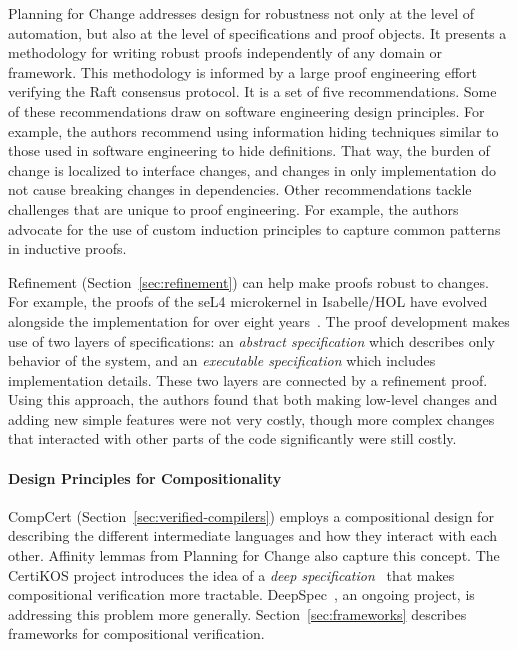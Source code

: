 Planning for Change addresses design for robustness not only at the level of automation,
but also at the level of specifications and proof objects. It presents a methodology
for writing robust proofs independently of any domain or framework. This methodology
is informed by a large proof engineering effort verifying the Raft consensus protocol.
It is a set of five recommendations. Some of these recommendations draw on software engineering design principles.
For example, the authors recommend using information hiding techniques similar to those used in software engineering to hide definitions.
That way, the burden of change is localized to interface changes, and changes in only implementation do not cause
breaking changes in dependencies. Other recommendations tackle challenges that are unique to proof engineering. For example, the authors
advocate for the use of custom induction principles to capture common patterns in inductive proofs.

Refinement (Section~\ref{sec:refinement}) can help make proofs robust to changes.
For example, the proofs of the seL4 microkernel in Isabelle/HOL have evolved alongside the implementation for
over eight years~\citep{Klein2014micro}.
The proof development makes use of two layers of specifications: an \textit{abstract specification} which describes only behavior of
the system, and an \textit{executable specification} which includes implementation details. These two layers are connected by
a refinement proof.
Using this approach, the authors found that both making low-level changes and adding new simple features were not very costly,
though more complex changes that interacted with other parts of the code significantly were still costly.

\paragraph{Design Principles for Compositionality}
CompCert (Section~\ref{sec:verified-compilers}) employs a compositional design for describing the different intermediate languages
and how they interact with each other. Affinity lemmas from Planning for Change
also capture this concept.
The CertiKOS project introduces the idea of a \textit{deep specification}~\citep{Gu-al:POPL15} that makes
compositional verification more tractable. DeepSpec~\citep{DeepSpec},
an ongoing project, is addressing this problem more generally.
Section~\ref{sec:frameworks} describes frameworks for compositional verification.


